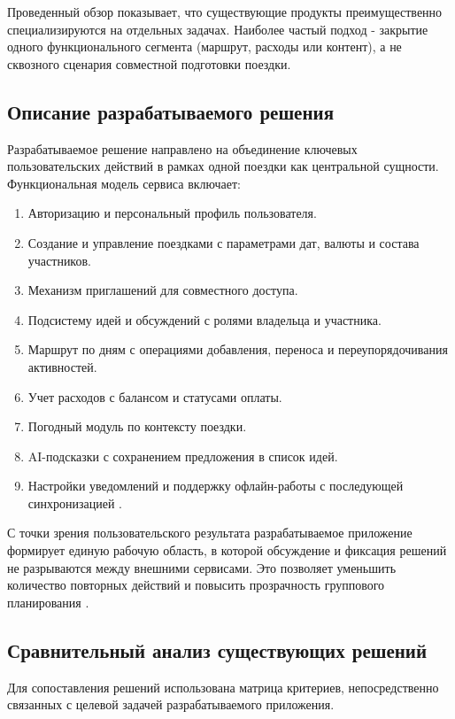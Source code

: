 Проведенный обзор показывает, что существующие продукты преимущественно специализируются на отдельных задачах. Наиболее частый подход - закрытие одного функционального сегмента (маршрут, расходы или контент), а не сквозного сценария совместной подготовки поездки.

\subsection{Описание разрабатываемого решения}
Разрабатываемое решение направлено на объединение ключевых пользовательских действий в рамках одной поездки как центральной сущности. Функциональная модель сервиса включает:
\begin{enumerate}
    \item Авторизацию и персональный профиль пользователя.
    \item Создание и управление поездками с параметрами дат, валюты и состава участников.
    \item Механизм приглашений для совместного доступа.
    \item Подсистему идей и обсуждений с ролями владельца и участника.
    \item Маршрут по дням с операциями добавления, переноса и переупорядочивания активностей.
    \item Учет расходов с балансом и статусами оплаты.
    \item Погодный модуль по контексту поездки.
    \item AI-подсказки с сохранением предложения в список идей.
    \item Настройки уведомлений и поддержку офлайн-работы с последующей синхронизацией .
\end{enumerate}

С точки зрения пользовательского результата разрабатываемое приложение формирует единую рабочую область, в которой обсуждение и фиксация решений не разрываются между внешними сервисами. Это позволяет уменьшить количество повторных действий и повысить прозрачность группового планирования .

\subsection{Сравнительный анализ существующих решений}
Для сопоставления решений использована матрица критериев, непосредственно связанных с целевой задачей разрабатываемого приложения.

